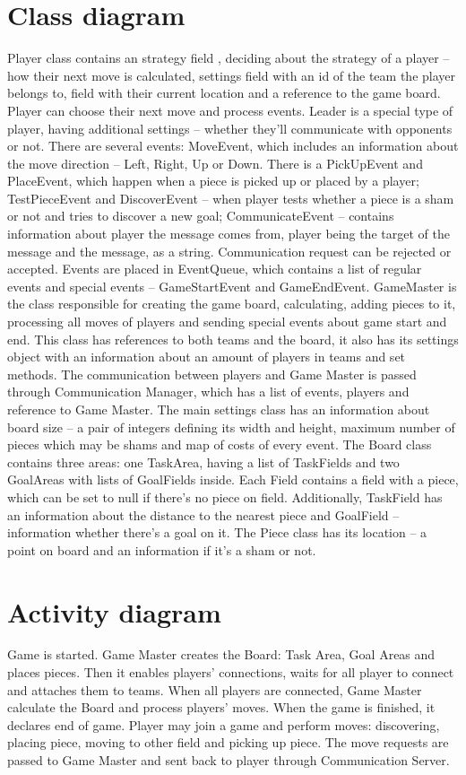 \documentclass[a4paper]{article}
\begin{document}
\section{Class diagram}

Player class contains an strategy field , deciding about the strategy of a player – how their next move is calculated, settings field with an id of the team the player belongs to, field with their current location and a reference to the game board. Player can choose their next move and process events. Leader is a special type of player, having additional settings – whether they’ll communicate with opponents or not.
There are several events: MoveEvent, which includes an information about the move direction – Left, Right, Up or Down. There is a PickUpEvent and PlaceEvent, which happen when a piece is picked up or placed by a player; TestPieceEvent and DiscoverEvent – when player tests whether a piece is a sham or not and tries to discover a new goal; CommunicateEvent – contains information about player the message comes from, player being the target of the message and the message, as a string. Communication request can be rejected or accepted. Events are placed in EventQueue, which contains a list of regular events and special events – GameStartEvent and GameEndEvent.
GameMaster is the class responsible for creating the game board, calculating, adding pieces to it, processing all moves of players and sending special events about game start and end. This class has references to both teams and the board, it also has its settings object with an information about an amount of players in teams and set methods.
The communication between players and Game Master is passed through Communication Manager, which has a list of events, players and reference to Game Master.
The main settings class has an information about board size – a pair of integers defining its width and height, maximum number of pieces which may be shams and map of costs of every event.
The Board class contains three areas: one TaskArea, having a list of TaskFields and two GoalAreas with lists of GoalFields inside. Each Field contains a field with a piece, which can be set to null if there’s no piece on field. Additionally, TaskField has an information about the distance to the nearest piece and GoalField – information whether there’s a goal on it.
The Piece class has its location – a point on board and an information if it’s a sham or not.
\newpage
\section{Activity diagram}

Game is started. Game Master creates the Board: Task Area, Goal Areas and places pieces. Then it enables players' connections, waits for all player to connect and attaches them to teams. When all players are connected, Game Master calculate the Board and process players' moves. When the game is finished, it declares end of game.
Player may join a game and perform moves: discovering, placing piece, moving to other field and picking up piece. The move requests are passed to Game Master and sent back to player through Communication Server.
\newpage
\end{document}
